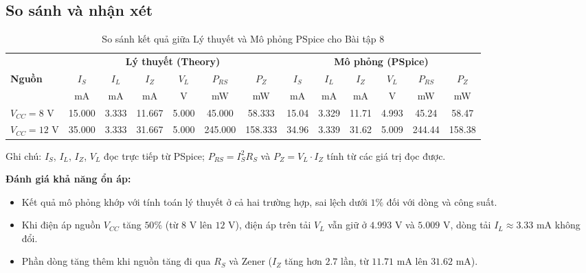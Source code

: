\subsection{So sánh và nhận xét}
\begin{table}[H]
  \centering
  \caption{So sánh kết quả giữa Lý thuyết và Mô phỏng PSpice cho Bài tập 8}
  \small
  \setlength{\tabcolsep}{3.5pt}
  \begin{tabular}{lcccccccccccc}
    \toprule
    & \multicolumn{6}{c}{\textbf{Lý thuyết (Theory)}} & \multicolumn{6}{c}{\textbf{Mô phỏng (PSpice)}} \\
    \cmidrule(lr){2-7}\cmidrule(lr){8-13}
    \textbf{Nguồn} & $I_S$ & $I_L$ & $I_Z$ & $V_L$ & $P_{RS}$ & $P_Z$ & $I_S$ & $I_L$ & $I_Z$ & $V_L$ & $P_{RS}$ & $P_Z$ \\
    & {\scriptsize mA} & {\scriptsize mA} & {\scriptsize mA} & {\scriptsize V} & {\scriptsize mW} & {\scriptsize mW} & {\scriptsize mA} & {\scriptsize mA} & {\scriptsize mA} & {\scriptsize V} & {\scriptsize mW} & {\scriptsize mW} \\
    \midrule
    $V_{CC} = 8\text{ V}$ & 15.000 & 3.333 & 11.667 & 5.000 & 45.000 & 58.333 & 15.04 & 3.329 & 11.71 & 4.993 & 45.24 & 58.47 \\
    $V_{CC} = 12\text{ V}$ & 35.000 & 3.333 & 31.667 & 5.000 & 245.000 & 158.333 & 34.96 & 3.339 & 31.62 & 5.009 & 244.44 & 158.38 \\
    \bottomrule
  \end{tabular}
  \par\smallskip
  {\footnotesize Ghi chú: $I_S$, $I_L$, $I_Z$, $V_L$ đọc trực tiếp từ PSpice; $P_{RS} = I_S^2 R_S$ và $P_Z = V_L \cdot I_Z$ tính từ các giá trị đọc được.}
\end{table}

\noindent\textbf{Đánh giá khả năng ổn áp:}
\begin{itemize}[leftmargin=1.5em]
  \item Kết quả mô phỏng khớp với tính toán lý thuyết ở cả hai trường hợp, sai lệch dưới $1\%$ đối với dòng và công suất.
  \item Khi điện áp nguồn $V_{CC}$ tăng $50\%$ (từ $8\text{ V}$ lên $12\text{ V}$), điện áp trên tải $V_L$ vẫn giữ ở $4.993\text{ V}$ và $5.009\text{ V}$, dòng tải $I_L \approx 3.33\text{ mA}$ không đổi.
  \item Phần dòng tăng thêm khi nguồn tăng đi qua $R_S$ và Zener ($I_Z$ tăng hơn $2.7$ lần, từ $11.71\text{ mA}$ lên $31.62\text{ mA}$).
\end{itemize}

